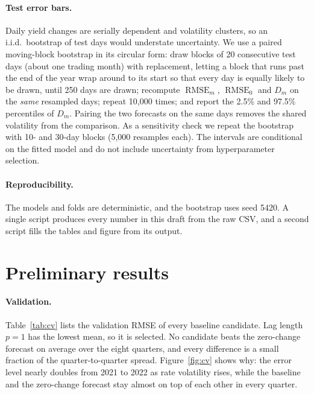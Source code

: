 \documentclass{article}
\newcommand{\RMSE}{\operatorname{RMSE}}
\begin{document}
\paragraph{Test error bars.} Daily yield changes are serially dependent and volatility clusters, so an i.i.d.\ bootstrap of test days would understate uncertainty. We use a paired moving-block bootstrap \citep{kunsch1989} in its circular form: draw blocks of 20 consecutive test days (about one trading month) with replacement, letting a block that runs past the end of the year wrap around to its start so that every day is equally likely to be drawn, until 250 days are drawn; recompute $\RMSE_m$, $\RMSE_0$ and $D_m$ on the \emph{same} resampled days; repeat 10,000 times; and report the 2.5\% and 97.5\% percentiles of $D_m$. Pairing the two forecasts on the same days removes the shared volatility from the comparison. As a sensitivity check we repeat the bootstrap with 10- and 30-day blocks (5,000 resamples each). The intervals are conditional on the fitted model and do not include uncertainty from hyperparameter selection.

\paragraph{Reproducibility.} The models and folds are deterministic, and the bootstrap uses seed 5420. A single script produces every number in this draft from the raw CSV, and a second script fills the tables and figure from its output.

\section{Preliminary results}\label{sec:results}
\paragraph{Validation.} Table~\ref{tab:cv} lists the validation RMSE of every baseline candidate. Lag length $p=1$ has the lowest mean, so it is selected. No candidate beats the zero-change forecast on average over the eight quarters, and every difference is a small fraction of the quarter-to-quarter spread. Figure~\ref{fig:cv} shows why: the error level nearly doubles from 2021 to 2022 as rate volatility rises, while the baseline and the zero-change forecast stay almost on top of each other in every quarter.
\end{document}
